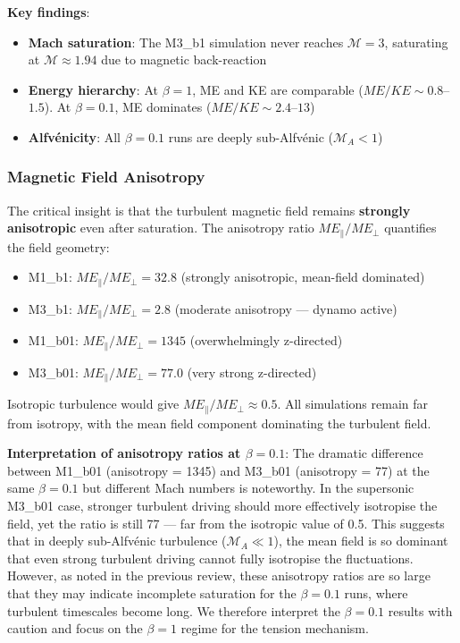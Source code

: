 \documentclass[11pt,a4paper]{article}
\begin{document}
\noindent\textbf{Key findings}:
\begin{itemize}
    \item \textbf{Mach saturation}: The M3\_b1 simulation never reaches $\mathcal{M} = 3$, saturating at $\mathcal{M} \approx 1.94$ due to magnetic back-reaction
    \item \textbf{Energy hierarchy}: At $\beta = 1$, ME and KE are comparable ($ME/KE \sim 0.8$--$1.5$). At $\beta = 0.1$, ME dominates ($ME/KE \sim 2.4$--$13$)
    \item \textbf{Alfv\'enicity}: All $\beta = 0.1$ runs are deeply sub-Alfv\'enic ($\mathcal{M}_A < 1$)
\end{itemize}

\subsubsection{Magnetic Field Anisotropy}

The critical insight is that the turbulent magnetic field remains \textbf{strongly anisotropic} even after saturation. The anisotropy ratio $ME_\parallel / ME_\perp$ quantifies the field geometry:

\begin{itemize}
    \item M1\_b1: $ME_\parallel/ME_\perp = 32.8$ (strongly anisotropic, mean-field dominated)
    \item M3\_b1: $ME_\parallel/ME_\perp = 2.8$ (moderate anisotropy — dynamo active)
    \item M1\_b01: $ME_\parallel/ME_\perp = 1345$ (overwhelmingly z-directed)
    \item M3\_b01: $ME_\parallel/ME_\perp = 77.0$ (very strong z-directed)
\end{itemize}

Isotropic turbulence would give $ME_\parallel/ME_\perp \approx 0.5$. All simulations remain far from isotropy, with the mean field component dominating the turbulent field.

\textbf{Interpretation of anisotropy ratios at $\beta = 0.1$}: The dramatic difference between M1\_b01 (anisotropy = 1345) and M3\_b01 (anisotropy = 77) at the same $\beta = 0.1$ but different Mach numbers is noteworthy. In the supersonic M3\_b01 case, stronger turbulent driving should more effectively isotropise the field, yet the ratio is still 77 — far from the isotropic value of 0.5. This suggests that in deeply sub-Alfv\'enic turbulence ($\mathcal{M}_A \ll 1$), the mean field is so dominant that even strong turbulent driving cannot fully isotropise the fluctuations. However, as noted in the previous review, these anisotropy ratios are so large that they may indicate incomplete saturation for the $\beta = 0.1$ runs, where turbulent timescales become long. We therefore interpret the $\beta = 0.1$ results with caution and focus on the $\beta = 1$ regime for the tension mechanism.
\end{document}
